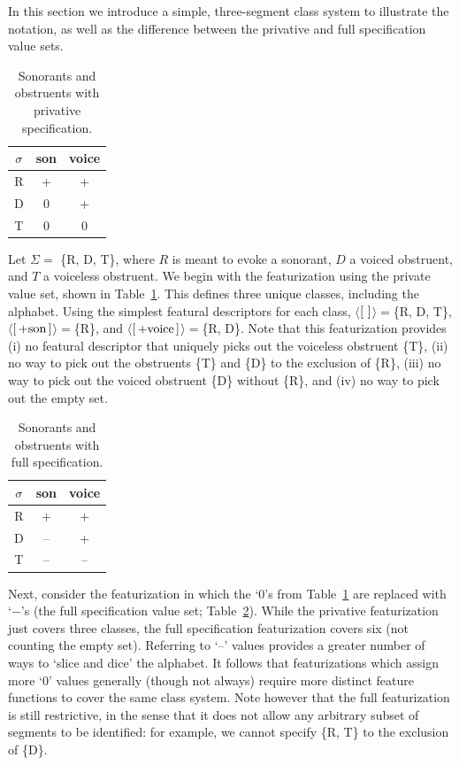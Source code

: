 \documentclass[12pt, oneside]{article}   	%
\newcommand{\featmat}[1]
{$\begin{bsmallmatrix*}[l]\text{\normalsize #1}\end{bsmallmatrix*}$}
\begin{document}
In this section we introduce a simple, three-segment class system to illustrate the notation, as well as the difference between the privative and full specification value sets.

\begin{table}[h]
	\centering
	\begin{tabular} {|c||c|c|}
		\hline
		$\sigma$ & son & voice \\ \hline
		R & + & + \\
		D & 0 & + \\
		T & 0 & 0 \\
		\hline
	\end{tabular}
	\caption{Sonorants and obstruents with privative specification.}
	\label{table:privative}
\end{table}

Let $\Sigma =$ \{R, D, T\}, where $R$ is meant to evoke a sonorant, $D$ a voiced obstruent, and $T$ a voiceless obstruent. We begin with the featurization using the private value set, shown in Table~\ref{table:privative}. This defines three unique classes, including the alphabet. Using the simplest featural descriptors for each class, $\langle$\featmat{}$\rangle = $\{R, D, T\},  $\langle$\featmat{+son}$\rangle = $\{R\}, and $\langle$\featmat{+voice}$\rangle =$\{R, D\}. Note that this featurization provides (i) no featural descriptor that uniquely picks out the voiceless obstruent \{T\}, (ii) no way to pick out the obstruents \{T\} and \{D\} to the exclusion of \{R\}, (iii) no way to pick out the voiced obstruent \{D\} without \{R\}, and (iv) no way to pick out the empty set.

\begin{table}[h]
	\centering
	\begin{tabular} {|c||c|c|}
		\hline
		$\sigma$ & son & voice \\ \hline
		R & + & + \\
		D & -- & + \\
		T & -- & -- \\
		\hline
	\end{tabular}
	\caption{Sonorants and obstruents with full specification.}
	\label{table:full}
\end{table}
Next, consider the featurization in which the `$0$'s from Table~\ref{table:privative} are replaced with `$-$'s (the full specification value set; Table~\ref{table:full}).  While the privative featurization just covers three classes, the full specification featurization covers six (not counting the empty set). Referring to `--' values provides a greater number of ways to `slice and dice' the alphabet. It follows that featurizations which assign more `$0$' values generally (though not always) require more distinct feature functions to cover the same class system. Note however that the full featurization is still restrictive, in the sense that it does not allow any arbitrary subset of segments to be identified: for example, we cannot specify \{R, T\} to the exclusion of \{D\}.
\end{document}
